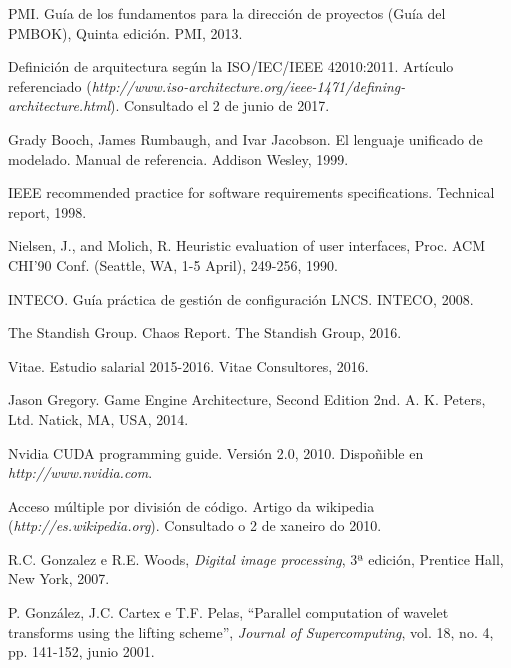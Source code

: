 

\begin{thebibliography}{99}
	
PMI. Guía de los fundamentos para la dirección de proyectos (Guía del PMBOK), Quinta edición. PMI, 2013. 	
	
 Definición de arquitectura según la ISO/IEC/IEEE 42010:2011. Artículo referenciado ({\it http://www.iso-architecture.org/ieee-1471/defining-architecture.html}). Consultado el 2 de junio de 2017.

Grady Booch, James Rumbaugh, and Ivar Jacobson. El lenguaje unificado de modelado. Manual
de referencia. Addison Wesley, 1999.

IEEE recommended practice for software requirements specifications. Technical report, 1998.

Nielsen, J., and Molich, R. Heuristic evaluation of user interfaces, Proc. ACM CHI'90 Conf. (Seattle, WA, 1-5 April), 249-256, 1990.

INTECO. Guía práctica de gestión de configuración LNCS. INTECO, 2008.

The Standish Group. Chaos Report. The Standish Group, 2016.

Vitae. Estudio salarial 2015-2016. Vitae Consultores, 2016.

Jason Gregory. Game Engine Architecture, Second Edition 2nd. A. K. Peters, Ltd. Natick, MA, USA, 2014.

	
 Nvidia CUDA programming guide. Versión 2.0, 2010. Dispoñible en {\it http://www.nvidia.com}.

 Acceso múltiple por división de código. Artigo da wikipedia ({\it http://es.wikipedia.org}). Consultado o 2 de xaneiro do 2010.

 R.C. Gonzalez e R.E. Woods, {\it Digital image processing}, 3ª edición, Prentice Hall, New York, 2007.

 P. González, J.C. Cartex e T.F. Pelas, ``Parallel computation of wavelet transforms using the lifting scheme'', {\it Journal of Supercomputing}, vol. 18, no. 4, pp. 141-152, junio 2001.
\end{thebibliography}

